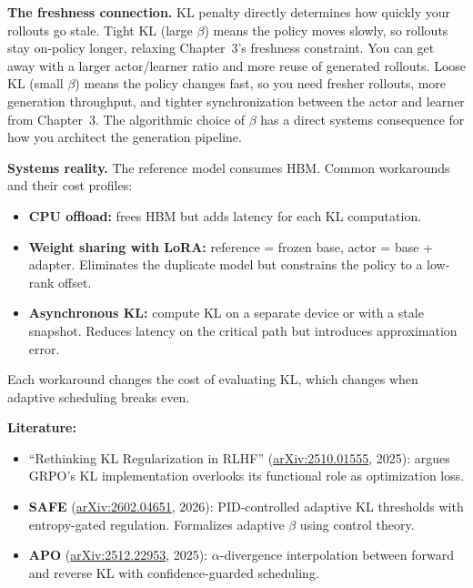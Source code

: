 \textbf{The freshness connection.} KL penalty directly determines how quickly your rollouts go stale. Tight KL (large $\beta$) means the policy moves slowly, so rollouts stay on-policy longer, relaxing Chapter~3's freshness constraint. You can get away with a larger actor/learner ratio and more reuse of generated rollouts. Loose KL (small $\beta$) means the policy changes fast, so you need fresher rollouts, more generation throughput, and tighter synchronization between the actor and learner from Chapter~3. The algorithmic choice of $\beta$ has a direct systems consequence for how you architect the generation pipeline.

\textbf{Systems reality.} The reference model consumes HBM. Common workarounds and their cost profiles:
\begin{itemize}
  \item \textbf{CPU offload:} frees HBM but adds latency for each KL computation.
  \item \textbf{Weight sharing with LoRA:} reference = frozen base, actor = base + adapter. Eliminates the duplicate model but constrains the policy to a low-rank offset.
  \item \textbf{Asynchronous KL:} compute KL on a separate device or with a stale snapshot. Reduces latency on the critical path but introduces approximation error.
\end{itemize}
Each workaround changes the cost of evaluating KL, which changes when adaptive scheduling breaks even.

\textbf{Literature:}
\begin{itemize}
  \item ``Rethinking KL Regularization in RLHF'' (\href{https://arxiv.org/abs/2510.01555}{arXiv:2510.01555}, 2025): argues GRPO's KL implementation overlooks its functional role as optimization loss.
  \item \textbf{SAFE} (\href{https://arxiv.org/abs/2602.04651}{arXiv:2602.04651}, 2026): PID-controlled adaptive KL thresholds with entropy-gated regulation. Formalizes adaptive $\beta$ using control theory.
  \item \textbf{APO} (\href{https://arxiv.org/abs/2512.22953}{arXiv:2512.22953}, 2025): $\alpha$-divergence interpolation between forward and reverse KL with confidence-guarded scheduling.
\end{itemize}

